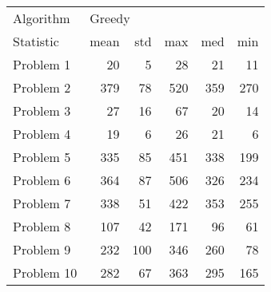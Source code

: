 \begin{tabular}{lrrrrr}
\toprule
Algorithm & \multicolumn{5}{l}{Greedy} \\
Statistic &   mean &  std &  max &  med &  min \\
\midrule
Problem 1  &     20 &    5 &   28 &   21 &   11 \\
Problem 2  &    379 &   78 &  520 &  359 &  270 \\
Problem 3  &     27 &   16 &   67 &   20 &   14 \\
Problem 4  &     19 &    6 &   26 &   21 &    6 \\
Problem 5  &    335 &   85 &  451 &  338 &  199 \\
Problem 6  &    364 &   87 &  506 &  326 &  234 \\
Problem 7  &    338 &   51 &  422 &  353 &  255 \\
Problem 8  &    107 &   42 &  171 &   96 &   61 \\
Problem 9  &    232 &  100 &  346 &  260 &   78 \\
Problem 10 &    282 &   67 &  363 &  295 &  165 \\
\bottomrule
\end{tabular}
